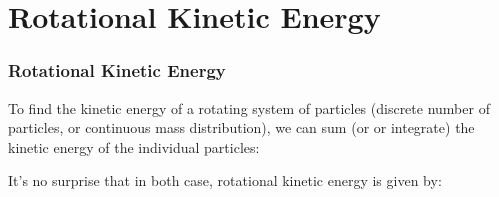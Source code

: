 \documentclass[12pt,compress,aspectratio=169]{beamer}
\begin{document}
\section{Rotational Kinetic Energy}

\begin{frame}
  \frametitle{Rotational Kinetic Energy}
  To find the kinetic energy of a rotating system of particles (discrete number
  of particles, or continuous mass distribution), we can sum (or or integrate)
  the kinetic energy of the individual particles:
    
  
  \vspace{-0.15in}It's no surprise that in both case, rotational kinetic energy
  is given by:
  
\end{frame}
\end{document}
